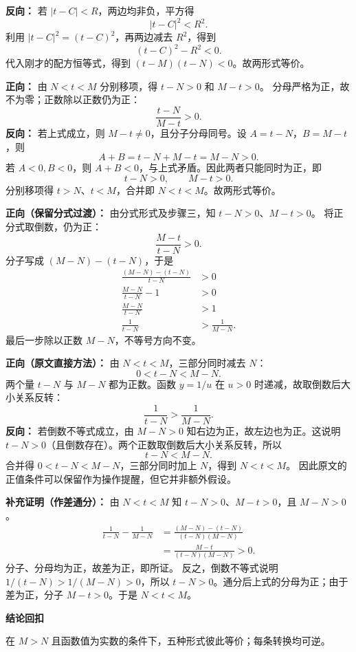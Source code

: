 \begin{proofbox}
\begin{description}[style=nextline,leftmargin=2.8em,labelsep=0.5em,itemsep=0.55em]
\textbf{反向：} 若 $|t-C|<R$，两边均非负，平方得
\[|t-C|^2<R^2.\]
利用 $|t-C|^2=(t-C)^2$，再两边减去 $R^2$，得到
\[(t-C)^2-R^2<0.\]
代入刚才的配方恒等式，得到 $(t-M)(t-N)<0$。故两形式等价。
\item[\textbf{步骤三（分式形式）：}]
\textbf{正向：} 由 $N<t<M$ 分别移项，得 $t-N>0$ 和 $M-t>0$。
分母严格为正，故不为零；正数除以正数仍为正：
\[\frac{t-N}{M-t}>0.\]
\textbf{反向：} 若上式成立，则 $M-t\ne0$，且分子分母同号。设 $A=t-N$，$B=M-t$，则
\[A+B=t-N+M-t=M-N>0.\]
若 $A<0,B<0$，则 $A+B<0$，与上式矛盾。因此两者只能同时为正，即
\[t-N>0,\qquad M-t>0.\]
分别移项得 $t>N$、$t<M$，合并即 $N<t<M$。故两形式等价。
\item[\textbf{步骤四（倒数形式）：}]
\textbf{正向（保留分式过渡）：} 由分式形式及步骤三，知 $t-N>0$、$M-t>0$。
将正分式取倒数，仍为正：
\[\frac{M-t}{t-N}>0.\]
分子写成 $(M-N)-(t-N)$，于是
\begin{align*}
\frac{(M-N)-(t-N)}{t-N}&>0\\
\frac{M-N}{t-N}-1&>0\\
\frac{M-N}{t-N}&>1\\
\frac1{t-N}&>\frac1{M-N}.
\end{align*}
最后一步除以正数 $M-N$，不等号方向不变。

\textbf{正向（原文直接方法）：} 由 $N<t<M$，三部分同时减去 $N$：
\[0<t-N<M-N.\]
两个量 $t-N$ 与 $M-N$ 都为正数。函数 $y=1/u$ 在 $u>0$ 时递减，故取倒数后大小关系反转：
\[\frac1{t-N}>\frac1{M-N}.\]
\textbf{反向：} 若倒数不等式成立，由 $M-N>0$ 知右边为正，故左边也为正。这说明 $t-N>0$（且倒数存在）。两个正数取倒数后大小关系反转，所以
\[t-N<M-N.\]
合并得 $0<t-N<M-N$，三部分同时加上 $N$，得到 $N<t<M$。
因此原文的正值条件可以保留作为操作提醒，但它并非额外假设。

\textbf{补充证明（作差通分）：} 由 $N<t<M$ 知 $t-N>0$、$M-t>0$，且 $M-N>0$。
\begin{align*}
\frac1{t-N}-\frac1{M-N}
&=\frac{(M-N)-(t-N)}{(t-N)(M-N)}\\
&=\frac{M-t}{(t-N)(M-N)}>0.
\end{align*}
分子、分母均为正，故差为正，即所证。
反之，倒数不等式说明 $1/(t-N)>1/(M-N)>0$，所以 $t-N>0$。通分后上式的分母为正；由于差为正，分子 $M-t>0$。于是 $N<t<M$。
\end{description}
\medskip
\textbf{\textcolor{CProof}{结论回扣}}
\begin{center}
\end{center}
在 $M>N$ 且函数值为实数的条件下，五种形式彼此等价；每条转换均可逆。
\end{proofbox}
